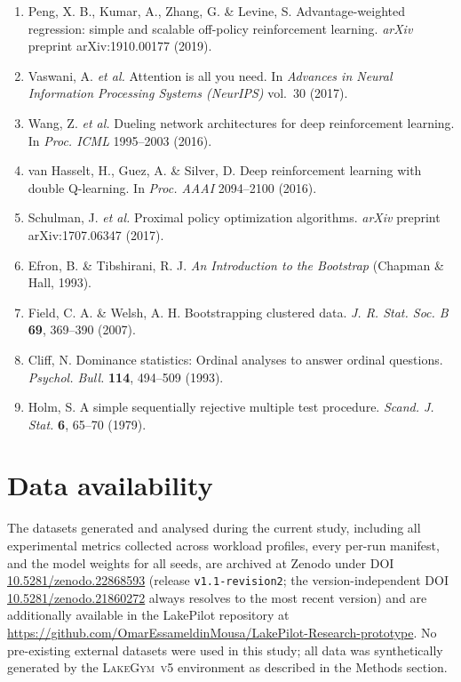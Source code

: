 \documentclass[fleqn,10pt]{wlscirep}
\newcommand{\env}{\textsc{LakeGym~v5}}
\begin{document}
\begin{enumerate}
\item Peng, X. B., Kumar, A., Zhang, G. \& Levine, S.
  Advantage-weighted regression: simple and scalable off-policy
  reinforcement learning. \textit{arXiv} preprint arXiv:1910.00177
  (2019).

\item Vaswani, A. \textit{et al.} Attention is all you need. In
  \textit{Advances in Neural Information Processing Systems (NeurIPS)}
  vol.~30 (2017).

\item Wang, Z. \textit{et al.} Dueling network architectures for deep
  reinforcement learning. In \textit{Proc. ICML} 1995--2003 (2016).

\item van Hasselt, H., Guez, A. \& Silver, D. Deep reinforcement learning
  with double Q-learning. In \textit{Proc. AAAI} 2094--2100 (2016).

\item Schulman, J. \textit{et al.} Proximal policy optimization algorithms.
  \textit{arXiv} preprint arXiv:1707.06347 (2017).

\item Efron, B. \& Tibshirani, R. J. \textit{An Introduction to the
  Bootstrap} (Chapman \& Hall, 1993).

\item Field, C. A. \& Welsh, A. H. Bootstrapping clustered data.
  \textit{J. R. Stat. Soc. B} \textbf{69}, 369--390 (2007).

\item Cliff, N. Dominance statistics: Ordinal analyses to answer ordinal
  questions. \textit{Psychol. Bull.} \textbf{114}, 494--509 (1993).

\item Holm, S. A simple sequentially rejective multiple test procedure.
  \textit{Scand. J. Stat.} \textbf{6}, 65--70 (1979).

\end{enumerate}

\section*{Data availability}
The datasets generated and analysed during the current study, including
all experimental metrics collected across workload profiles, every
per-run manifest, and the model weights for all seeds, are archived at
Zenodo under DOI
\href{https://doi.org/10.5281/zenodo.22868593}{10.5281/zenodo.22868593}
(release \texttt{v1.1-revision2}; the version-independent DOI
\href{https://doi.org/10.5281/zenodo.21860272}{10.5281/zenodo.21860272}
always resolves to the most recent version)
and are additionally available in the LakePilot repository at
\url{https://github.com/OmarEssameldinMousa/LakePilot-Research-prototype}.
No pre-existing external datasets were used in this study; all data was
synthetically generated by the \env{} environment as described in the
Methods section.
\end{document}
